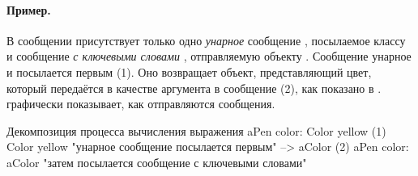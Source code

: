 \documentclass[a4paper,10pt,twoside]{book}
\begin{document}

\paragraph{Пример.}
В сообщении  присутствует только одно \emph{унарное} сообщение , посылаемое классу  и сообщение \emph{с ключевыми словами} , отправляемую объекту . Сообщение  унарное и посылается первым (1). Оно возвращает объект, представляющий цвет, который передаётся в качестве аргумента в сообщение  (2), как показано в .
 графически показывает, как отправляются сообщения.

\begin{example}[decColor]{Декомпозиция процесса вычисления выражения }{}
        aPen color: Color yellow
(1)                       Color yellow        "унарное сообщение посылается первым"
                        --> aColor
(2)   aPen color: aColor                 "затем посылается сообщение с ключевыми словами"
\end{example}

\end{document}
